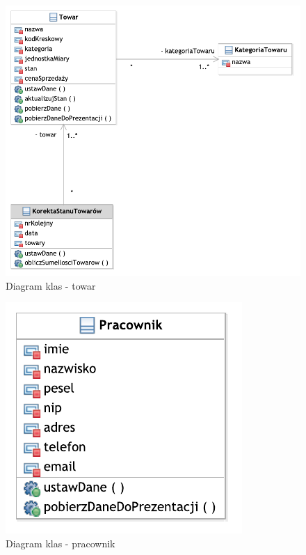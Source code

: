 \begin{figure}[!htb]
  \begin{center}
    \includegraphics[scale=0.7]{../img/model/diagram_towar.pdf}
  \end{center}
  \caption{Diagram klas - towar}
  \label{fig:DiagramKlasTowar}
\end{figure}
\FloatBarrier

\begin{figure}[!htb]
  \begin{center}
    \includegraphics[scale=0.7]{../img/model/diagram_pracownik.pdf}
  \end{center}
  \caption{Diagram klas - pracownik}
  \label{fig:DiagramKlasPracownik}
\end{figure}
\FloatBarrier

